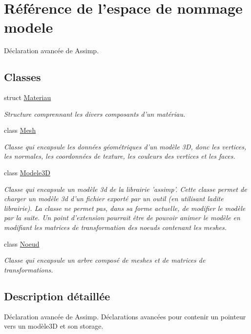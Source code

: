 \hypertarget{namespacemodele}{\section{Référence de l'espace de nommage modele}
\label{namespacemodele}
}


Déclaration avancée de Assimp.  


\subsection*{Classes}
\begin{DoxyCompactItemize}
\item 
struct \hyperlink{structmodele_1_1_materiau}{Materiau}
\begin{DoxyCompactList}\small\item\em Structure comprennant les divers composants d'un matériau. \end{DoxyCompactList}\item 
class \hyperlink{classmodele_1_1_mesh}{Mesh}
\begin{DoxyCompactList}\small\item\em Classe qui encapsule les données géométriques d'un modèle 3\-D, donc les vertices, les normales, les coordonnées de texture, les couleurs des vertices et les faces. \end{DoxyCompactList}\item 
class \hyperlink{classmodele_1_1_modele3_d}{Modele3\-D}
\begin{DoxyCompactList}\small\item\em Classe qui encapsule un modèle 3d de la librairie 'assimp'. Cette classe permet de charger un modèle 3d d'un fichier exporté par un outil (en utilisant ladite librairie). La classe ne permet pas, dans sa forme actuelle, de modifier le modèle par la suite. Un point d'extension pourrait être de pouvoir animer le modèle en modifiant les matrices de transformation des noeuds contenant les meshes. \end{DoxyCompactList}\item 
class \hyperlink{classmodele_1_1_noeud}{Noeud}
\begin{DoxyCompactList}\small\item\em Classe qui encapsule un arbre composé de meshes et de matrices de transformations. \end{DoxyCompactList}\end{DoxyCompactItemize}


\subsection{Description détaillée}
Déclaration avancée de Assimp. Déclarations avancées pour contenir un pointeur vers un modèle3\-D et son storage. 